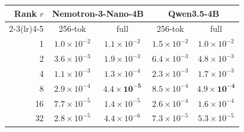\begin{tabular}{@{}r cc cc@{}}
\toprule
\multirow{2}{*}{Rank $r$}
  & \multicolumn{2}{c}{Nemotron-3-Nano-4B} & \multicolumn{2}{c}{Qwen3.5-4B} \\
\cmidrule(lr){2-3}\cmidrule(lr){4-5}
   & 256-tok & full         & 256-tok & full         \\
\midrule
1  & $1.0\!\times\!10^{-2}$ & $1.1\!\times\!10^{-2}$ & $1.5\!\times\!10^{-2}$ & $1.0\!\times\!10^{-2}$ \\
2  & $3.6\!\times\!10^{-3}$ & $1.9\!\times\!10^{-3}$ & $6.4\!\times\!10^{-3}$ & $4.8\!\times\!10^{-3}$ \\
4  & $1.1\!\times\!10^{-3}$ & $1.3\!\times\!10^{-4}$ & $2.3\!\times\!10^{-3}$ & $1.7\!\times\!10^{-3}$ \\
8  & $2.9\!\times\!10^{-4}$ & $\mathbf{4.4\!\times\!10^{-5}}$ & $8.5\!\times\!10^{-4}$ & $\mathbf{4.9\!\times\!10^{-4}}$ \\
16 & $7.7\!\times\!10^{-5}$ & $1.4\!\times\!10^{-5}$ & $2.6\!\times\!10^{-4}$ & $1.6\!\times\!10^{-4}$ \\
32 & $2.8\!\times\!10^{-5}$ & $4.4\!\times\!10^{-6}$ & $7.3\!\times\!10^{-5}$ & $5.3\!\times\!10^{-5}$ \\
\bottomrule
\end{tabular}
